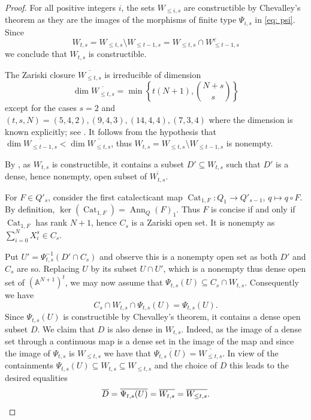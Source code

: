 \documentclass[reqno]{amsart}
\DeclareMathOperator{\Ann}{Ann}
\newcommand{\A}{\mathbb{A}}
\theoremstyle{plain} %
\theoremstyle{definition}
\theoremstyle{remark}
\begin{document}
\begin{proof}





For all positive integers $i$, the sets $W_{\leq i,s}$ are constructible by Chevalley's theorem as they are the images of the morphisms of finite type  $\Psi_{i,s}$ in \eqref{eq: psi}. Since 
\[
W_{t,s}=W_{\leq t,s}\setminus W_{\leq t-1,s}=W_{\leq t,s}\cap W_{\leq t-1,s}^c
\]
 we conclude that $W_{t,s}$ is constructible.  
  
 The Zariski closure $\overline{W_{\leq t,s}}$ is irreducible of dimension 
 \[
 \dim\overline{W_{\leq t,s}}= \min\left \{t(N+1),\binom{N+s}{s}\right \}
 \]
  except for the cases $s=2$ and  $(t,s,N)=(5,4,2), (9,4,3), (14,4,4), (7,3,4)$ where the dimension is known explicitly; see \cite[Theorem 1.6]{IK}. It follows from the hypothesis that $\dim\overline{W_{\leq t-1,s}}< \dim\overline{W_{\leq t,s}}$, thus $W_{t,s}=W_{\leq t,s}\setminus W_{\leq t-1,s}$ is nonempty. 
  
  By \cite[Theorem 10.19]{GW}, as $W_{t,s}$ is constructible, it contains a subset $D'\subseteq W_{t,s}$ such that $D'$ is a dense, hence nonempty, open subset of $\overline{W_{t,s}}$. 

For $F\in Q'_s$, consider the first
catalecticant map
$\operatorname{Cat}_{1,F}:Q_1\rightarrow Q'_{s-1}$, $q\mapsto q\circ F$.
By definition, $\ker(\operatorname{Cat}_{1,F})=\Ann_Q(F)_1$.
Thus $F$ is concise if and only if 
$\operatorname{Cat}_{1,F}$ has rank $N+1$, hence $C_s$ is a Zariski open set. It is nonempty as $\sum_{i=0}^N X_i^s\in C_s$.
  
  Put $U'=\Psi_{t,s}^{-1}(D'\cap C_s)$ and observe this is a nonempty open set as both $D'$ and $C_s$ are so. Replacing $U$ by its subset $U\cap U'$, which is a nonempty thus dense open set of $(\A^{N+1})^t$, we may now assume that $\Psi_{t,s}(U)\subseteq C_s\cap W_{t,s}$. Consequently we have
  \[
 C_s\cap  W_{t,s} \cap \Psi_{t,s}(U)=\Psi_{t,s}(U).
  \]
 Since $\Psi_{t,s}(U)$ is constructible by Chevalley's theorem, it contains a dense open subset $D$. We claim that $D$ is also dense in $W_{t,s}$. Indeed, as the image of a dense set through a continuous map is a dense set in the image of the map and since the image of $\Psi_{t,s}$ is $W_{\leq t,s}$ we have that $\overline{\Psi_{t,s}(U)}=\overline{W_{\leq t,s}}$. In view of the containments $\Psi_{t,s}(U)\subseteq W_{t,s}\subseteq W_{\leq t,s}$ and the choice of $D$ this leads to the desired equalities
 \[
 \overline{D}=\overline{\Psi_{t,s}(U)}=\overline{W_{t,s}}=\overline{W_{\leq t,s}}.\qedhere
 \]
\end{proof}
\end{document}
